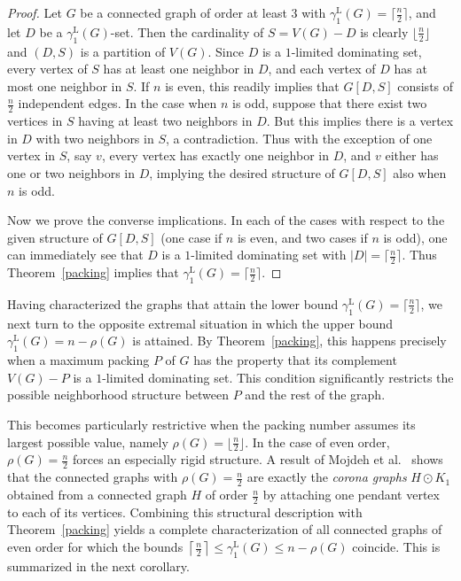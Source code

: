 \documentclass[11pt]{article}
\newcommand{\gammaenaL}{\gamma_1^{\mathrm L}}
\begin{document}
\begin{proof} Let $G$ be a connected graph  of order at least $3$ with $\gammaenaL(G)= \lceil \frac{n}{2} \rceil$, and let $D$ be a $\gammaenaL(G)$-set. Then the cardinality of $S=V(G)-D$ is clearly $\lfloor \frac{n}{2}\rfloor$ and $(D,S)$ is a partition of $V(G)$. Since $D$ is a $1$-limited dominating set, every vertex of $S$ has at least one neighbor in $D$, and each vertex of $D$ has at most one neighbor in $S$. If $n$ is even, this readily implies that $G[D,S]$ consists of $\frac{n}{2}$ independent edges. In the case when $n$ is odd, suppose that there exist two vertices in $S$ having at least two neighbors in $D$. But this implies there is a vertex in $D$ with two neighbors in $S$, a contradiction. Thus with the exception of one vertex in $S$, say $v$, every vertex has exactly one neighbor in $D$, and $v$ either has one or two neighbors in $D$, implying the desired structure of $G[D,S]$ also when $n$ is odd.

Now we prove the converse implications. In each of the cases  with respect to the given structure of $G[D,S]$ (one case if $n$ is even, and two cases if $n$ is odd), one can immediately see that $D$ is a $1$-limited dominating set with $|D|=\lceil \frac{n}{2} \rceil$. Thus Theorem~\ref{packing} implies that $\gammaenaL(G)=\lceil \frac{n}{2} \rceil$.
\end{proof}


Having characterized the graphs that attain the lower bound 
$\gammaenaL(G)=\lceil \frac n2 \rceil$, we next turn to the opposite 
extremal situation in which the upper bound 
$\gammaenaL(G)=n-\rho(G)$ is attained.  
By Theorem~\ref{packing}, this happens precisely when a maximum packing 
$P$ of $G$ has the property that its complement $V(G)-P$ is a 
$1$-limited dominating set.  
This condition significantly restricts the possible neighborhood 
structure between $P$ and the rest of the graph.

This becomes particularly restrictive when the packing number assumes its 
largest possible value, namely $\rho(G)=\lfloor \frac n2 \rfloor$.  
In the case of even order, $\rho(G)=\frac n2 $ forces an especially rigid 
structure.  
A result of Mojdeh et al.~\cite{packing} shows that the connected 
graphs with $\rho(G)=\frac n2 $ are exactly the \textit{corona graphs} 
$H\odot K_1$ obtained from a connected graph $H$ of order $\frac n2$ by 
attaching one pendant vertex to each of its vertices.  
Combining this structural description with Theorem~\ref{packing} yields 
a complete characterization of all connected graphs of even order 
for which the bounds 
$\left\lceil\frac n2\right\rceil \le \gamma^{\mathrm L}_1(G) \le n-\rho(G)$
coincide. This is summarized in the next corollary.
\end{document}
